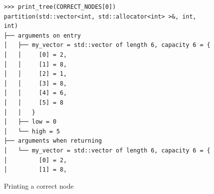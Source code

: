 \begin{figure}[h]
    \centering
    \caption{Printing a correct node}
    \label{fig:printCorrectNode}
    \begin{verbatim}
>>> print_tree(CORRECT_NODES[0])
partition(std::vector<int, std::allocator<int> >&, int, int)                                                                                          
├── arguments on entry                                                                                                                                
│   ├── my_vector = std::vector of length 6, capacity 6 = {                                                                                           
│   │     [0] = 2,                                                                                                                                    
│   │     [1] = 8,                                                                                                                                    
│   │     [2] = 1,                                                                                                                                    
│   │     [3] = 8,                                                                                                                                    
│   │     [4] = 6,                                                                                                                                    
│   │     [5] = 8                                                                                                                                     
│   │   }                                                                                                                                             
│   ├── low = 0                                                                                                                                       
│   └── high = 5                                                                                                                                      
├── arguments when returning                                                                                                                          
│   └── my_vector = std::vector of length 6, capacity 6 = {                                                                                           
│         [0] = 2,                                                                                                                                    
│         [1] = 8,                                                                                                                                    

\end{verbatim}
\end{figure}

